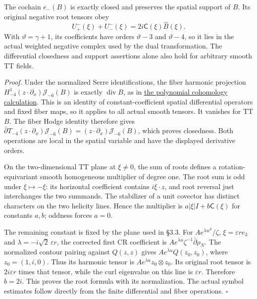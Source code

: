 \documentclass[
  english,
  11pt,
  reqno]{amsart}
\begin{document}
The cochain \(e_-(B)\) is exactly closed and preserves the spatial
support of \(B\). Its original negative root tensors obey%
 \[
U^-_+(\xi)+U^-_-(\xi)=2i\mathsf C(\xi)\widehat B(\xi).
\] With \(\vartheta=\gamma+1\), its coefficients have orders
\(\vartheta-3\) and \(\vartheta-4\), so it lies in the actual weighted
negative complex used by the dual transformation. The differential
closedness and support assertions alone also hold for arbitrary smooth
TT fields.

\emph{Proof.} Under the normalized Serre identifications, the fiber
harmonic projection \(H_{-4}^1(z\cdot\partial_x)\mathscr J_{-6}(B)\) is
exactly \(\operatorname{div}B\), as in
\hyperref[prop:online-polynomial-cr-cohomology]{the polynomial
cohomology calculation}. This is an identity of constant-coefficient
spatial differential operators and fixed fiber maps, so it applies to
all actual smooth tensors. It vanishes for TT \(B\). The fiber Hodge
identity therefore gives
\(\bar\partial T_{-4}(z\cdot\partial_x)\mathscr J_{-6}(B)
 =(z\cdot\partial_x)\mathscr J_{-6}(B)\), which proves closedness. Both
operations are local in the spatial variable and have the displayed
derivative orders.

On the two-dimensional TT plane at \(\xi\ne0\), the sum of roots defines
a rotation-equivariant smooth homogeneous multiplier of degree one. The
root sum is odd under \(\xi\mapsto-\xi\): its horizontal coefficient
contains \(i\xi\cdot z\), and root reversal just interchanges the two
summands. The stabilizer of a unit covector has distinct characters on
the two helicity lines. Hence the multiplier is
\(a|\xi|I+b\mathsf C(\xi)\) for constants \(a,b\); oddness forces
\(a=0\).

The remaining constant is fixed by the plane used in §3.3. For
\(Ae^{\lambda w^0}/\zeta\), \(\xi=\varepsilon r e_3\) and
\(\lambda=-i\sqrt2\,\varepsilon r\), the corrected first CR coefficient
is \(Ae^{\lambda u}\zeta^{-1}\bar\partial\rho_N\). The normalized
contour pairing against \(Q(z,z)\) gives \(Ae^{\lambda u}Q(z_0,z_0)\),
where \(z_0=(1,i,0)\). Thus its harmonic tensor is
\(Ae^{\lambda u}z_0\otimes z_0\). Its original root tensor is
\(2i\varepsilon r\) times that tensor, while the curl eigenvalue on this
line is \(\varepsilon r\). Therefore \(b=2i\). This proves the root
formula with its normalization. The actual symbol estimates follow
directly from the finite differential and fiber operations.
\hfill\(\square\)
\end{document}
